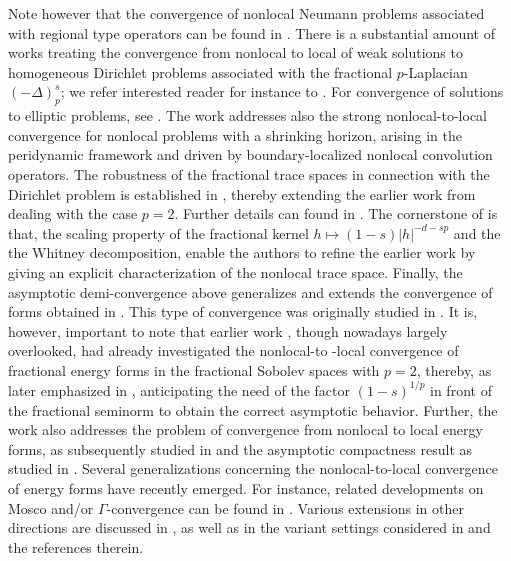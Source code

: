 \documentclass[12pt, reqno]{amsart}%
\theoremstyle{plain}  %
\theoremstyle{definition}  %
\numberwithin{equation}{section}
\begin{document}
Note however that the convergence of nonlocal Neumann problems associated with regional type operators can be found in \cite{AMRT08, AMRT10,DLS15}. There is a substantial amount of works treating the convergence from nonlocal to local of weak solutions to homogeneous Dirichlet problems associated with the fractional $p$-Laplacian $(-\Delta)^s_p$; we refer interested reader for instance to  \cite{BPS16,FeSa20,BS22,BO20,BO21,SaVe22}.  For convergence of solutions to elliptic problems, see \cite{guy-thesis,Voi17,Gru25}. The work \cite{ScDu25} addresses also the strong nonlocal-to-local convergence for nonlocal problems with a shrinking horizon, arising in the peridynamic framework and driven by boundary-localized nonlocal convolution operators.  The robustness of the fractional trace spaces in connection with the Dirichlet problem is established in \cite{GrKa25}, thereby extending the earlier work from \cite{GrHe24} dealing with the case $p=2$. Further details can found in \cite{Gru25}.  The cornerstone  of \cite{GrHe24,GrKa25} is that, the scaling property of the fractional kernel $h\mapsto(1-s)|h|^{-d-sp}$ and the the Whitney decomposition, enable the authors to refine the earlier work \cite{DyKa19} by  giving an explicit characterization of the nonlocal trace space. Finally, the asymptotic demi-convergence above generalizes and extends the convergence of forms obtained in \cite{Fog23,guy-thesis}. This type of convergence was originally studied in \cite{BBM01}. It is, however, important to note that earlier work \cite{AAS67}, though nowadays largely overlooked, had already investigated the nonlocal-to -local convergence of fractional energy forms in the fractional Sobolev spaces with $p=2$, thereby, as later emphasized in \cite{BBM01}, anticipating the need of the factor $(1-s)^{1/p}$ in front of the fractional seminorm to obtain the correct asymptotic behavior. Further, the work \cite{AAS67} also addresses the problem of convergence from nonlocal to local energy forms, as subsequently studied in \cite{BBM01} and the asymptotic compactness result as studied in \cite{Pon04}. Several generalizations concerning the nonlocal-to-local convergence of energy forms have recently emerged. For instance, related developments on Mosco and/or $\Gamma$-convergence can be found in \cite{Wei22,guy-thesis,FGKV20,Pon04-gamma,Voi17}. Various extensions in other directions are discussed in \cite{BMR20,DB22,DD22,Fog23,PS17,Mil05}, as well as in the variant settings considered in \cite{NPSV18,LMP19} and the references therein.
\end{document}
